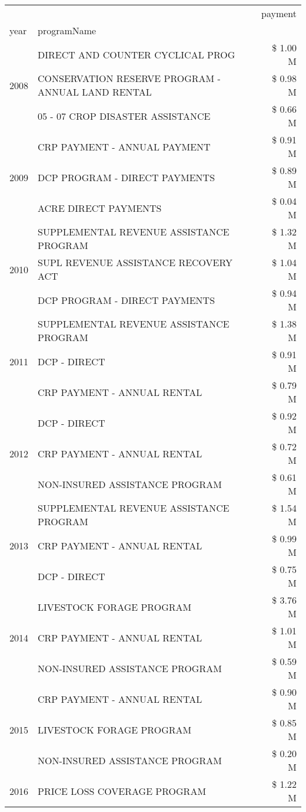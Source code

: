 \begin{tabular}{llr}
\toprule
 &  & payment \\
year & programName &  \\
\midrule
\multirow[t]{3}{*}{2008} & DIRECT AND COUNTER CYCLICAL PROG & \$ 1.00 M \\
 & CONSERVATION RESERVE PROGRAM - ANNUAL LAND RENTAL & \$ 0.98 M \\
 & 05 - 07 CROP DISASTER ASSISTANCE & \$ 0.66 M \\
\cline{1-3}
\multirow[t]{3}{*}{2009} & CRP PAYMENT - ANNUAL PAYMENT & \$ 0.91 M \\
 & DCP PROGRAM - DIRECT PAYMENTS & \$ 0.89 M \\
 & ACRE DIRECT PAYMENTS & \$ 0.04 M \\
\cline{1-3}
\multirow[t]{3}{*}{2010} & SUPPLEMENTAL REVENUE ASSISTANCE PROGRAM & \$ 1.32 M \\
 & SUPL REVENUE ASSISTANCE RECOVERY ACT & \$ 1.04 M \\
 & DCP PROGRAM - DIRECT PAYMENTS & \$ 0.94 M \\
\cline{1-3}
\multirow[t]{3}{*}{2011} & SUPPLEMENTAL REVENUE ASSISTANCE PROGRAM & \$ 1.38 M \\
 & DCP - DIRECT & \$ 0.91 M \\
 & CRP PAYMENT - ANNUAL RENTAL & \$ 0.79 M \\
\cline{1-3}
\multirow[t]{3}{*}{2012} & DCP - DIRECT & \$ 0.92 M \\
 & CRP PAYMENT - ANNUAL RENTAL & \$ 0.72 M \\
 & NON-INSURED ASSISTANCE PROGRAM & \$ 0.61 M \\
\cline{1-3}
\multirow[t]{3}{*}{2013} & SUPPLEMENTAL REVENUE ASSISTANCE PROGRAM & \$ 1.54 M \\
 & CRP PAYMENT - ANNUAL RENTAL & \$ 0.99 M \\
 & DCP - DIRECT & \$ 0.75 M \\
\cline{1-3}
\multirow[t]{3}{*}{2014} & LIVESTOCK FORAGE PROGRAM & \$ 3.76 M \\
 & CRP PAYMENT - ANNUAL RENTAL & \$ 1.01 M \\
 & NON-INSURED ASSISTANCE PROGRAM & \$ 0.59 M \\
\cline{1-3}
\multirow[t]{3}{*}{2015} & CRP PAYMENT - ANNUAL RENTAL & \$ 0.90 M \\
 & LIVESTOCK FORAGE PROGRAM & \$ 0.85 M \\
 & NON-INSURED ASSISTANCE PROGRAM & \$ 0.20 M \\
\cline{1-3}
\multirow[t]{3}{*}{2016} & PRICE LOSS COVERAGE PROGRAM & \$ 1.22 M \\

\end{tabular}
